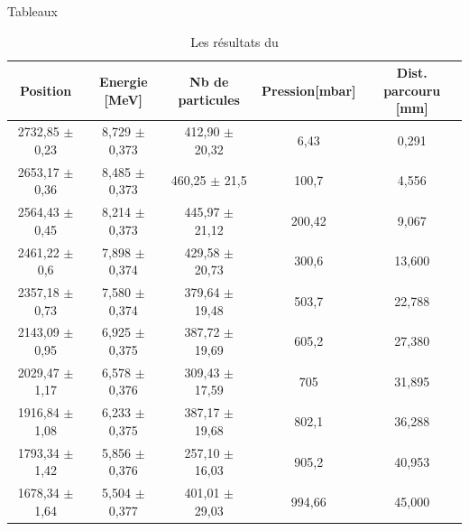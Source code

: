 \documentclass[a4paper,11pt,liststotocnumbered,bibtotocnumbered]{scrartcl}
\begin{document}
\begin{appendix}
\begin{section}{Tableaux}
   \begin{table}[H]
    \begin{center}
     \begin{tabular}{c|c|c|c|c}
      Position	&Energie [MeV]	&Nb de particules	&Pression[mbar]		&Dist. parcouru [mm]\\ \hline
      2732,85 $\pm$ 0,23	&8,729 $\pm$ 0,373	&412,90 $\pm$ 20,32	&6,43	&0,291\\
      2653,17 $\pm$ 0,36	&8,485 $\pm$ 0,373	&460,25 $\pm$ 21,5	&100,7	&4,556\\
      2564,43 $\pm$ 0,45	&8,214 $\pm$ 0,373	&445,97 $\pm$ 21,12	&200,42	&9,067\\
      2461,22 $\pm$ 0,6		&7,898 $\pm$ 0,374	&429,58 $\pm$ 20,73	&300,6	&13,600\\
      2357,18 $\pm$ 0,73	&7,580 $\pm$ 0,374	&379,64 $\pm$ 19,48	&503,7	&22,788\\
      2143,09 $\pm$ 0,95	&6,925 $\pm$ 0,375	&387,72 $\pm$ 19,69	&605,2	&27,380\\
      2029,47 $\pm$ 1,17	&6,578 $\pm$ 0,376	&309,43 $\pm$ 17,59	&705	&31,895\\
      1916,84 $\pm$ 1,08	&6,233 $\pm$ 0,375	&387,17 $\pm$ 19,68	&802,1	&36,288\\
      1793,34 $\pm$ 1,42	&5,856 $\pm$ 0,376	&257,10 $\pm$ 16,03	&905,2	&40,953\\
      1678,34 $\pm$ 1,64	&5,504 $\pm$ 0,377	&401,01 $\pm$ 29,03	&994,66	&45,000\\
     \end{tabular}
    \caption{\label{tabelle-po}Les résultats du }
    \end{center}
   \end{table}
  \end{section}
 \end{appendix}

 \listoffigures  
\end{document}
